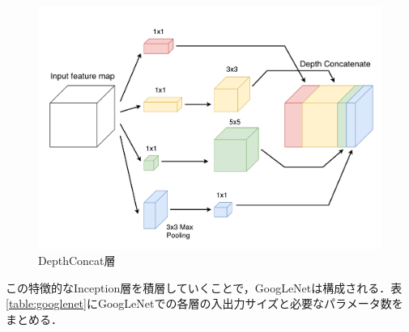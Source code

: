 {\begin{figure}[h]
  \centering
  \includegraphics[scale=0.5]{./chap2/fig/depthconcat.pdf}
  \caption{DepthConcat層}
  \label{fig:depthconcat}
\end{figure}

この特徴的なInception層を積層していくことで，GoogLeNetは構成される．表\ref{table:googlenet}にGoogLeNetでの各層の入出力サイズと必要なパラメータ数をまとめる．

}
